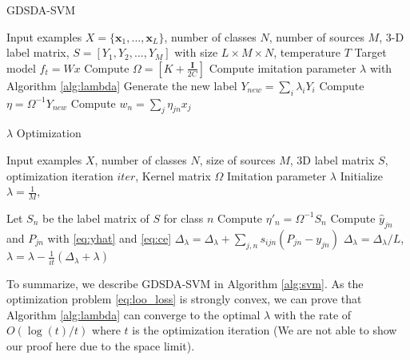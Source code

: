 \begin{algorithm}[t]
	\caption{GDSDA-SVM}\label{alg:svm}
	\begin{algorithmic}
		\REQUIRE Input examples $X=\{\textbf{x}_1,...,\textbf{x}_L\}$, number of classes $N$, number of sources $M$, 3-D label matrix, $S=[Y_1,Y_2,...,Y_{M}]$ with size $L\times M \times N$, temperature $T$ %
		\ENSURE Target model $f_t = Wx$
		\STATE Compute $\Omega=[K+\frac{\mathbf{I}}{2C}]$
		\STATE Compute imitation parameter $\lambda$ with Algorithm \ref{alg:lambda}
		\STATE Generate the new label $Y_{new}=\sum_i\lambda_iY_i$
		\STATE Compute $\eta = \Omega^{-1}Y_{new}$
		\STATE Compute $w_n = \sum_j \eta_{jn}x_j$
	\end{algorithmic}	
\end{algorithm}
\begin{algorithm}[t]
	\caption{$\lambda$ Optimization}\label{alg:lambda}
\begin{algorithmic}
	\REQUIRE Input examples $X$, number of classes $N$, size of sources $M$, 3D label matrix $S$,  optimization iteration $iter$, Kernel matrix $\Omega$
    \ENSURE Imitation parameter $\lambda$
    \STATE Initialize $\lambda = \frac{1}{M}$, 
    
    \STATE Let $S_n$ be the label matrix of $S$ for class $n$
    \STATE Compute $\eta'_n=\Omega^{-1}S_n$ 
    \ENDFOR
	    \STATE Compute $\hat{y}_{jn}$ and $P_{jn}$ with \eqref{eq:yhat}  and \eqref{eq:ce}
	    \FOR {each $\textbf{x}_j$ in $X$}
		    \STATE $\Delta_{\lambda} = \Delta_{\lambda}+\sum_{j,n}s_{ijn}\left(P_{jn}-{y}_{jn}\right)$
	    \ENDFOR
	    \STATE $\Delta_{\lambda} =\Delta_{\lambda}/L$, $\lambda = \lambda - \frac{1}{it}(\Delta_{\lambda}+\lambda)$
    \ENDFOR
\end{algorithmic}	
\end{algorithm}

To summarize, we describe GDSDA-SVM in Algorithm \ref{alg:svm}. As the optimization problem \eqref{eq:loo_loss} is strongly convex, we can prove that Algorithm \ref{alg:lambda} can converge to the optimal $\lambda$ with the rate of $O(\log(t)/t)$ where $t$ is the optimization iteration (We are not able to show our proof here due to the space limit). 




